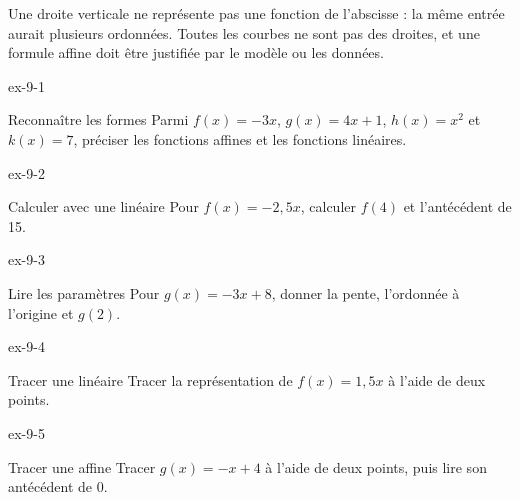 \begin{attention}Une droite verticale ne représente pas une fonction de l’abscisse : la même entrée aurait plusieurs ordonnées. Toutes les courbes ne sont pas des droites, et une formule affine doit être justifiée par le modèle ou les données.\end{attention}
\clearpage{}
\begin{blocLivre}{ex-9-1}\begin{exercice}[1]{Reconnaître les formes}
Parmi $f(x)=-3x$, $g(x)=4x+1$, $h(x)=x^2$ et $k(x)=7$, préciser les fonctions affines et les fonctions linéaires.
\end{exercice}\end{blocLivre}
\begin{blocLivre}{ex-9-2}\begin{exercice}[1]{Calculer avec une linéaire}
Pour $f(x)=-2{,}5x$, calculer $f(4)$ et l’antécédent de 15.
\end{exercice}\end{blocLivre}
\begin{blocLivre}{ex-9-3}\begin{exercice}[1]{Lire les paramètres}
Pour $g(x)=-3x+8$, donner la pente, l’ordonnée à l’origine et $g(2)$.
\end{exercice}\end{blocLivre}
\begin{blocLivre}{ex-9-4}\begin{exercice}[1]{Tracer une linéaire}
Tracer la représentation de $f(x)=1{,}5x$ à l’aide de deux points.
\label{fig-ex-9-4}
\end{exercice}\end{blocLivre}
\begin{blocLivre}{ex-9-5}\begin{exercice}[1]{Tracer une affine}
Tracer $g(x)=-x+4$ à l’aide de deux points, puis lire son antécédent de 0.
\label{fig-ex-9-5}
\end{exercice}\end{blocLivre}

